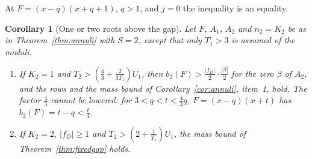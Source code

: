 \documentclass[11pt]{article}
\newtheorem{corollary}[theorem]{Corollary}
\begin{document}
At $F=(x-q)(x+q+1)$, $q>1$, and $j=0$ the inequality is an equality.

\begin{corollary}[One or two roots above the gap]\label{cor:twonear}
Let $F$, $A_1$, $A_2$ and $n_2=K_2$ be as in Theorem~\ref{thm:annuli} with
$S=2$, except that only $T_1>3$ is assumed of the moduli.
\begin{enumerate}
\item If $K_2=1$ and $T_2>(\frac43+\frac2{3T_1})U_1$, then
$b_2(F)>\frac{|f_D|}2\cdot\frac{|\beta|}2$ for the zero $\beta$ of $A_2$, and
the rows and the mass bound of Corollary~\ref{cor:annuli}, item~1, hold.
The factor $\frac43$ cannot be lowered: for $3<q<t<\frac43q$,
$F=(x-q)(x+t)$ has $b_2(F)=t-q<\frac t4$.
\item If $K_2=2$, $|f_D|\ge1$ and $T_2>(2+\frac1{T_1})U_1$, the mass bound
of Theorem~\ref{thm:fixedgap} holds.
\end{enumerate}
\end{corollary}
\end{document}
